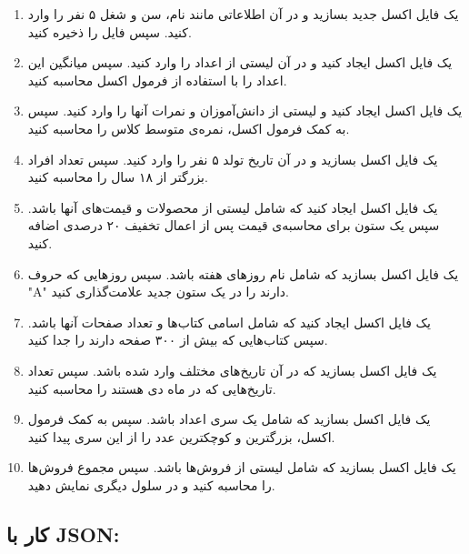 \documentclass[b5paper,12pt]{article}
\begin{document}
	\begin{enumerate}
		\item یک فایل اکسل جدید بسازید و در آن اطلاعاتی مانند نام، سن و شغل ۵ نفر را وارد کنید. سپس فایل را ذخیره کنید.
		\item یک فایل اکسل ایجاد کنید و در آن لیستی از اعداد را وارد کنید. سپس میانگین این اعداد را با استفاده از فرمول اکسل محاسبه کنید.
		\item یک فایل اکسل ایجاد کنید و لیستی از دانش‌آموزان و نمرات آنها را وارد کنید. سپس به کمک فرمول اکسل، نمره‌ی متوسط کلاس را محاسبه کنید.
		\item یک فایل اکسل بسازید و در آن تاریخ تولد ۵ نفر را وارد کنید. سپس تعداد افراد بزرگتر از ۱۸ سال را محاسبه کنید.
		\item یک فایل اکسل ایجاد کنید که شامل لیستی از محصولات و قیمت‌های آنها باشد. سپس یک ستون برای محاسبه‌ی قیمت پس از اعمال تخفیف ۲۰ درصدی اضافه کنید.
		\item یک فایل اکسل بسازید که شامل نام روزهای هفته باشد. سپس روزهایی که حروف "A" دارند را در یک ستون جدید علامت‌گذاری کنید.
		\item یک فایل اکسل ایجاد کنید که شامل اسامی کتاب‌ها و تعداد صفحات آنها باشد. سپس کتاب‌هایی که بیش از ۳۰۰ صفحه دارند را جدا کنید.
		\item یک فایل اکسل بسازید که در آن تاریخ‌های مختلف وارد شده باشد. سپس تعداد تاریخ‌هایی که در ماه دی هستند را محاسبه کنید.
		\item یک فایل اکسل بسازید که شامل یک سری اعداد باشد. سپس به کمک فرمول اکسل، بزرگترین و کوچکترین عدد را از این سری پیدا کنید.
		\item یک فایل اکسل بسازید که شامل لیستی از فروش‌ها باشد. سپس مجموع فروش‌ها را محاسبه کنید و در سلول دیگری نمایش دهید.
	\end{enumerate}
	
	\subsection*{کار با JSON:}
	
\end{document}
